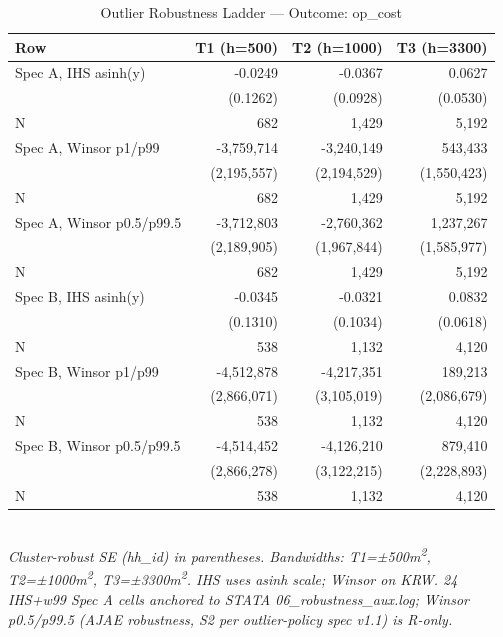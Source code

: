 \begin{table}[t]
\centering
\caption{Outlier Robustness Ladder --- Outcome: op\_cost}
\label{tab:rob_outlier_op_cost_en}
\begin{tabular}{lrrr}
\toprule
Row & T1 (h=500) & T2 (h=1000) & T3 (h=3300) \\
\midrule
Spec A, IHS asinh(y) & -0.0249 & -0.0367 & 0.0627 \\
        & (0.1262) & (0.0928) & (0.0530) \\
N       & 682 & 1,429 & 5,192 \\
Spec A, Winsor p1/p99 & -3,759,714 & -3,240,149 & 543,433 \\
        & (2,195,557) & (2,194,529) & (1,550,423) \\
N       & 682 & 1,429 & 5,192 \\
Spec A, Winsor p0.5/p99.5 & -3,712,803 & -2,760,362 & 1,237,267 \\
        & (2,189,905) & (1,967,844) & (1,585,977) \\
N       & 682 & 1,429 & 5,192 \\
Spec B, IHS asinh(y) & -0.0345 & -0.0321 & 0.0832 \\
        & (0.1310) & (0.1034) & (0.0618) \\
N       & 538 & 1,132 & 4,120 \\
Spec B, Winsor p1/p99 & -4,512,878 & -4,217,351 & 189,213 \\
        & (2,866,071) & (3,105,019) & (2,086,679) \\
N       & 538 & 1,132 & 4,120 \\
Spec B, Winsor p0.5/p99.5 & -4,514,452 & -4,126,210 & 879,410 \\
        & (2,866,278) & (3,122,215) & (2,228,893) \\
N       & 538 & 1,132 & 4,120 \\
\bottomrule
\end{tabular}
\\
\footnotesize\textit{Cluster-robust SE (hh\_id) in parentheses. Bandwidths: T1=±500m\textsuperscript{2}, T2=±1000m\textsuperscript{2}, T3=±3300m\textsuperscript{2}. IHS uses asinh scale; Winsor on KRW. 24 IHS+w99 Spec A cells anchored to STATA 06\_robustness\_aux.log; Winsor p0.5/p99.5 (AJAE robustness, S2 per outlier-policy spec v1.1) is R-only.}
\end{table}


